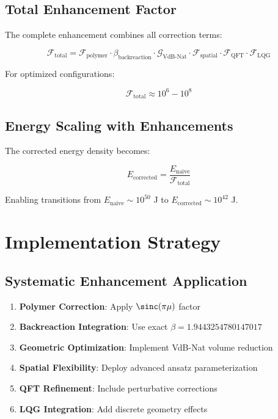 \documentclass[12pt,a4paper]{article}
\begin{document}
\subsection{Total Enhancement Factor}

The complete enhancement combines all correction terms:

\begin{equation}
\mathcal{F}_{\text{total}} = \mathcal{F}_{\text{polymer}} \cdot \beta_{\text{backreaction}} \cdot \mathcal{G}_{\text{VdB-Nat}} \cdot \mathcal{F}_{\text{spatial}} \cdot \mathcal{F}_{\text{QFT}} \cdot \mathcal{F}_{\text{LQG}}
\end{equation}

For optimized configurations:

\begin{equation}
\mathcal{F}_{\text{total}} \approx 10^{6} - 10^{8}
\end{equation}

\subsection{Energy Scaling with Enhancements}

The corrected energy density becomes:

\begin{equation}
E_{\text{corrected}} = \frac{E_{\text{naive}}}{\mathcal{F}_{\text{total}}}
\end{equation}

Enabling transitions from $E_{\text{naive}} \sim 10^{50}$ J to $E_{\text{corrected}} \sim 10^{42}$ J.

\section{Implementation Strategy}

\subsection{Systematic Enhancement Application}

\begin{enumerate}
\item \textbf{Polymer Correction}: Apply $\sinc(\pi\mu)$ factor
\item \textbf{Backreaction Integration}: Use exact $\beta = 1.9443254780147017$
\item \textbf{Geometric Optimization}: Implement VdB-Nat volume reduction
\item \textbf{Spatial Flexibility}: Deploy advanced ansatz parameterization
\item \textbf{QFT Refinement}: Include perturbative corrections
\item \textbf{LQG Integration}: Add discrete geometry effects
\end{enumerate}
\end{document}

